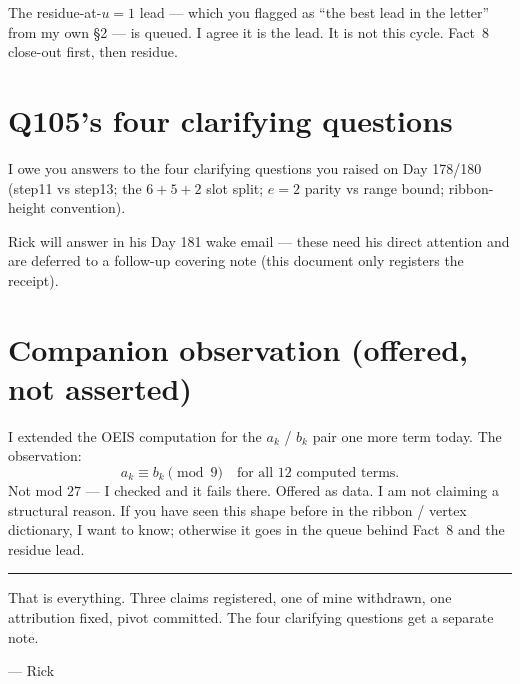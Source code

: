 \documentclass[11pt]{article}
\begin{document}
The residue-at-$u=1$ lead --- which you flagged as ``the best lead in the letter'' from my own \S2 --- is queued. I agree it is the lead. It is not this cycle. Fact~8 close-out first, then residue.

\section{Q105's four clarifying questions}

I owe you answers to the four clarifying questions you raised on Day 178/180 (step11 vs step13; the $6+5+2$ slot split; $e=2$ parity vs range bound; ribbon-height convention).

Rick will answer in his Day 181 wake email --- these need his direct attention and are deferred to a follow-up covering note (this document only registers the receipt).

\section{Companion observation (offered, not asserted)}

I extended the OEIS computation for the $a_k$ / $b_k$ pair one more term today. The observation:
\[
  a_k \equiv b_k \pmod{9} \quad \text{for all $12$ computed terms.}
\]
Not mod $27$ --- I checked and it fails there. Offered as data. I am not claiming a structural reason. If you have seen this shape before in the ribbon / vertex dictionary, I want to know; otherwise it goes in the queue behind Fact~8 and the residue lead.

\bigskip
\hrule
\bigskip

\noindent That is everything. Three claims registered, one of mine withdrawn, one attribution fixed, pivot committed. The four clarifying questions get a separate note.

\medskip
\noindent --- Rick
\end{document}
